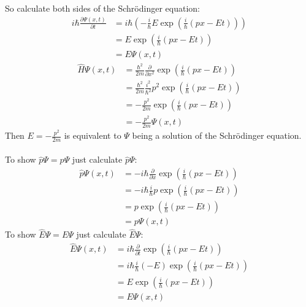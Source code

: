 \documentclass{article}
\begin{document}
  So calculate both sides of the Schrödinger equation:
  \begin{align*}
      i\hbar\frac{\partial\Psi(x, t)}{\partial t} &= i\hbar\left(-\frac{i}{\hbar}E\exp{\left(\frac{i}{\hbar}(px-Et)\right)}\right)\\
      &= E\exp{\left(\frac{i}{\hbar}(px-Et)\right)}\\
      &= E\Psi(x, t)
  \end{align*}
  \begin{align*}
      \hat{H}\Psi(x, t) &= \frac{\hbar^2}{2m}\frac{\partial}{\partial x^2}\exp{\left(\frac{i}{\hbar}(px-Et)\right)}\\
      &= \frac{\hbar^2}{2m}\frac{i^2}{\hbar^2}p^2\exp{\left(\frac{i}{\hbar}(px-Et)\right)}\\
      &= -\frac{p^2}{2m}\exp{\left(\frac{i}{\hbar}(px-Et)\right)}\\
      &= -\frac{p^2}{2m}\Psi(x, t)
  \end{align*}
  Then $E = -\frac{p^2}{2m}$ is equivalent to $\Psi$ being a solution of the Schrödinger equation.\\\\
  To show $\hat{p}\Psi = p\Psi$ just calculate $\hat{p}\Psi$:
  \begin{align*}
      \hat{p}\Psi(x, t) &= -i\hbar\frac{\partial}{\partial x}\exp{\left(\frac{i}{\hbar}(px-Et)\right)}\\
      &= -i\hbar\frac{i}{\hbar}p\exp{\left(\frac{i}{\hbar}(px-Et)\right)}\\
      &= p\exp{\left(\frac{i}{\hbar}(px-Et)\right)}\\
      &= p\Psi(x, t)
  \end{align*}
  To show $\hat{E}\Psi = E\Psi$ just calculate $\hat{E}\Psi$:
  \begin{align*}
      \hat{E}\Psi(x, t) &= i\hbar\frac{\partial}{\partial t}\exp{\left(\frac{i}{\hbar}(px-Et)\right)}\\
      &= i\hbar\frac{i}{\hbar}(-E)\exp{\left(\frac{i}{\hbar}(px-Et)\right)}\\
      &= E\exp{\left(\frac{i}{\hbar}(px-Et)\right)}\\
      &= E\Psi(x, t)
  \end{align*}
\end{document}
